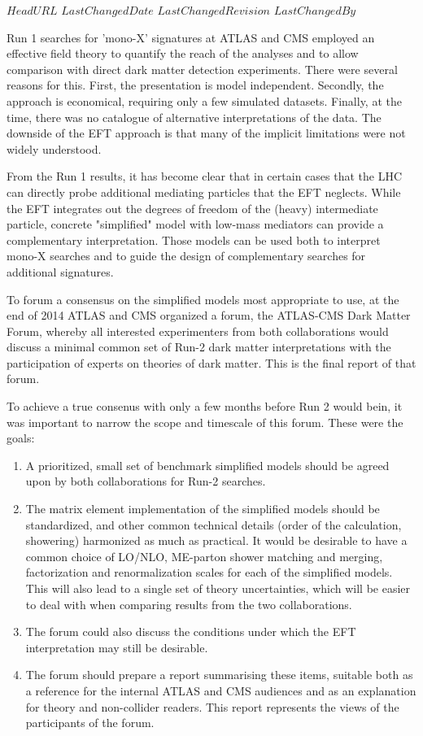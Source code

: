 \svnidlong
{$HeadURL$}
{$LastChangedDate$}
{$LastChangedRevision$}
{$LastChangedBy$}

Run 1 searches for 'mono-X' signatures at ATLAS and CMS employed an
effective field theory \cite{Goodman:2010ku} to quantify the reach of
the analyses and to allow comparison with direct dark matter detection
experiments. There were several reasons for this.  First, the
presentation is model independent.  Secondly, the approach is
economical, requiring only a few simulated datasets.  Finally, at the
time, there was no catalogue of alternative interpretations of the
data. The downside of the EFT approach is that many of the implicit
limitations were not widely understood.

From the Run 1 results, it has become clear that in certain cases
\cite{Busoni:2013lha} that the LHC can directly probe additional
mediating particles that the EFT neglects. While the EFT integrates
out the degrees of freedom of the (heavy) intermediate particle,
concrete "simplified" model with low-­mass mediators can provide a
complementary interpretation. Those models can be used both to
interpret mono-­X searches and to guide the design of complementary
searches for additional signatures.

To forum a consensus on the simplified models most appropriate to use,
at the end of 2014 ATLAS and CMS organized a forum, the ATLAS-­CMS
Dark Matter Forum, whereby all interested experimenters from both
collaborations would discuss a minimal common set of Run-2 dark matter
interpretations with the participation of experts on theories of dark
matter. This is the final report of that forum.

To achieve a true consenus with only a few months before Run 2 would
bein, it was important to narrow the scope and timescale of this
forum. These were the goals:

\begin{enumerate}
\item A prioritized, small set of benchmark simplified models should
  be agreed upon by both collaborations for Run-2 searches.
\item The matrix element implementation of the simplified models
  should be standardized, and other common technical details (order of
  the calculation, showering) harmonized as much as practical. It
  would be desirable to have a common choice of LO/NLO, ME-­parton
  shower matching and merging, factorization and renormalization
  scales for each of the simplified models. This will also lead to a
  single set of theory uncertainties, which will be easier to deal
  with when comparing results from the two collaborations.
\item The forum could also discuss the conditions under which the EFT
  interpretation may still be desirable.
\item The forum should prepare a report summarising these items,
  suitable both as a reference for the internal ATLAS and CMS
  audiences and as an explanation for theory and non-collider
  readers. This report represents the views of the participants of the
  forum.
\end{enumerate}

